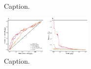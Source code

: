 \documentclass[pdflatex]{sn-jnl}
\begin{document}
\begin{figure}[h!]
    \centering
    \caption{
        Caption.
    }
    \label{fig:architecture}
\end{figure}

\begin{figure}[h!]
    \centering
    \includegraphics[width=0.4\textwidth]{figures/ROC_PR_hauksson.pdf}
    \caption{
        Caption.
    }
    \label{fig:architecture}
\end{figure}









\let\oldbibliography\thebibliography
\renewcommand{\thebibliography}[1]{%
  \oldbibliography{#1}%
  \setlength{\itemsep}{10pt}%
}
% 
% 
\newpage


\let\oldthebibliography=\thebibliography
\let\oldendthebibliography=\endthebibliography
\renewenvironment{thebibliography}[1]{
    \oldthebibliography{#1}
    \setcounter{enumiv}{34}
}{\oldendthebibliography}

\newpage
\unnumbered
\end{document}
